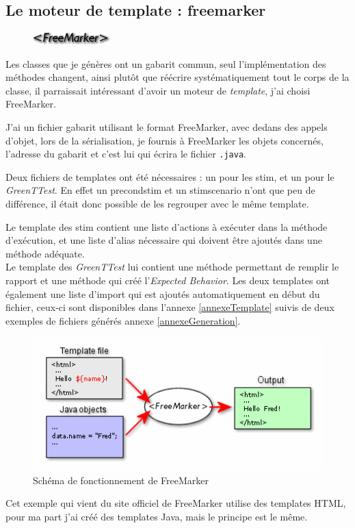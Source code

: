 		\subsection{Le moteur de template : freemarker}
		\begin{figure}
			\includegraphics[width=3cm]{contents/images/FreeMarker.png}
		\end{figure}
		Les classes que je génères ont un gabarit commun, seul l'implémentation des méthodes changent, ainsi plutôt que réécrire systématiquement tout le corps de la classe, il parraissait intéressant d'avoir un moteur de \textit{template}, j'ai choisi FreeMarker.

		J'ai un fichier gabarit utilisant le format FreeMarker, avec dedans des appels d'objet, lors de la sérialisation, je fournis à FreeMarker les objets concernés, l'adresse du gabarit et c'est lui qui écrira le fichier \texttt{.java}.

		Deux fichiers de templates ont été nécessaires : un pour les stim, et un pour le \textit{GreenTTest}. En effet un precondstim et un stimscenario n'ont que peu de différence, il était donc possible de les regrouper avec le même template.

		Le template des stim contient une liste d'actions à exécuter dans la méthode d'exécution, et une liste d'alias nécessaire qui doivent être ajoutés dans une méthode adéquate. \\
		Le template des \textit{GreenTTest} lui contient une méthode permettant de remplir le rapport et une méthode qui créé l'\textit{Expected Behavior}.
		Les deux templates ont également une liste d'import qui est ajoutés automatiquement en début du fichier, ceux-ci sont disponibles dans l'annexe \ref{annexeTemplate} suivis de deux exemples de fichiers générés annexe \ref{annexeGeneration}.

	
		\begin{figure}[H]
		\centering
		\includegraphics[width=12cm]{contents/images/FreeMarkerSchema.png}
		\caption{Schéma de fonctionnement de FreeMarker}
		\end{figure}
		\begin{remarque}
		Cet exemple qui vient du site officiel de FreeMarker utilise des templates HTML, pour ma part j'ai créé des templates Java, mais le principe est le même.
		\end{remarque}